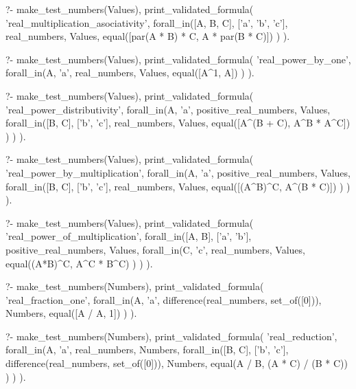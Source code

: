 \begin{fact}
\begin{prolog}
?-	make_test_numbers(Values),
	print_validated_formula(
		'real_multiplication_asociativity',
		forall_in([A, B, C], ['a', 'b', 'c'], real_numbers, Values,
			equal([par(A * B) * C, A * par(B * C)])
		)
	).				
\end{prolog}
\begin{prolog}
?-	make_test_numbers(Values),
	print_validated_formula(
		'real_power_by_one',
		forall_in(A, 'a', real_numbers, Values,
			equal([A^1, A])
		)
	).				
\end{prolog}
\begin{prolog}
?-	make_test_numbers(Values),
	print_validated_formula(
		'real_power_distributivity',
		forall_in(A, 'a', positive_real_numbers, Values,
			forall_in([B, C], ['b', 'c'], real_numbers, Values,
				equal([A^(B + C), A^B * A^C])
			)
		)
	).				
\end{prolog}
\begin{prolog}
?-	make_test_numbers(Values),
	print_validated_formula(
		'real_power_by_multiplication',
		forall_in(A, 'a', positive_real_numbers, Values,
			forall_in([B, C], ['b', 'c'], real_numbers, Values,
				equal([(A^B)^C, A^(B * C)])
			)
		)
	).
\end{prolog}
\begin{prolog}
?-	make_test_numbers(Values),
	print_validated_formula(
		'real_power_of_multiplication',
		forall_in([A, B], ['a', 'b'], positive_real_numbers, Values,
			forall_in(C, 'c', real_numbers, Values,
				equal((A*B)^C, A^C * B^C)
			)
		)
	).
\end{prolog}
\begin{prolog}
?-	make_test_numbers(Numbers),
	print_validated_formula(
		'real_fraction_one',
		forall_in(A, 'a', difference(real_numbers, set_of([0])), Numbers,
			equal([A / A, 1])
		)
	).
\end{prolog}
\begin{prolog}
?-	make_test_numbers(Numbers),
	print_validated_formula(
		'real_reduction',
		forall_in(A, 'a', real_numbers, Numbers,
			forall_in([B, C], ['b', 'c'], difference(real_numbers, set_of([0])), Numbers,
				equal(A / B, (A * C) / (B * C))
			)
		)
	).
\end{prolog}

\end{fact}
